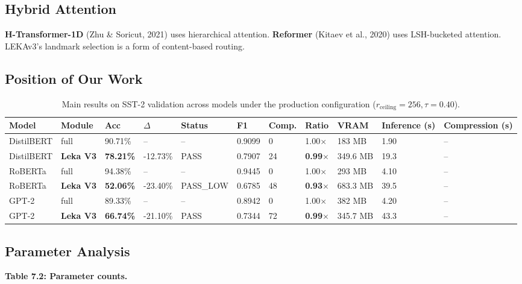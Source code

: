 \subsection{Hybrid Attention}

\textbf{H-Transformer-1D} (Zhu \& Soricut, 2021) uses hierarchical attention. 
\textbf{Reformer} (Kitaev et al., 2020) uses LSH-bucketed attention. LEKAv3's 
landmark selection is a form of content-based routing.

\subsection{Position of Our Work}

\begin{table}[t]
\centering
\small
\begin{tabular}{lllllllllll}
\toprule
\textbf{Model} & \textbf{Module} & \textbf{Acc} & \textbf{$\Delta$} & \textbf{Status} & \textbf{F1} & \textbf{Comp.} & \textbf{Ratio} & \textbf{VRAM} & \textbf{Inference (s)} & \textbf{Compression (s)} \\
\midrule
DistilBERT & full & 90.71\% & -- & -- & 0.9099 & 0 & 1.00$\times$ & 183 MB & 1.90 & -- \\
DistilBERT & \textbf{Leka V3} & \textbf{78.21\%} & -12.73\% & PASS & 0.7907 & 24 & \textbf{0.99$\times$} & 349.6 MB & 19.3 & -- \\
RoBERTa & full & 94.38\% & -- & -- & 0.9445 & 0 & 1.00$\times$ & 293 MB & 4.10 & -- \\
RoBERTa & \textbf{Leka V3} & \textbf{52.06\%} & -23.40\% & PASS_LOW & 0.6785 & 48 & \textbf{0.93$\times$} & 683.3 MB & 39.5 & -- \\
GPT-2 & full & 89.33\% & -- & -- & 0.8942 & 0 & 1.00$\times$ & 382 MB & 4.20 & -- \\
GPT-2 & \textbf{Leka V3} & \textbf{66.74\%} & -21.10\% & PASS & 0.7344 & 72 & \textbf{0.99$\times$} & 345.7 MB & 43.3 & -- \\
\bottomrule
\end{tabular}
\caption{Main results on SST-2 validation across models under the production configuration ($r_{\mathrm{ceiling}}=256, \tau=0.40$).}
\label{tab:main_sst2}
\end{table}

\subsection{Parameter Analysis}

\textbf{Table 7.2: Parameter counts.}

